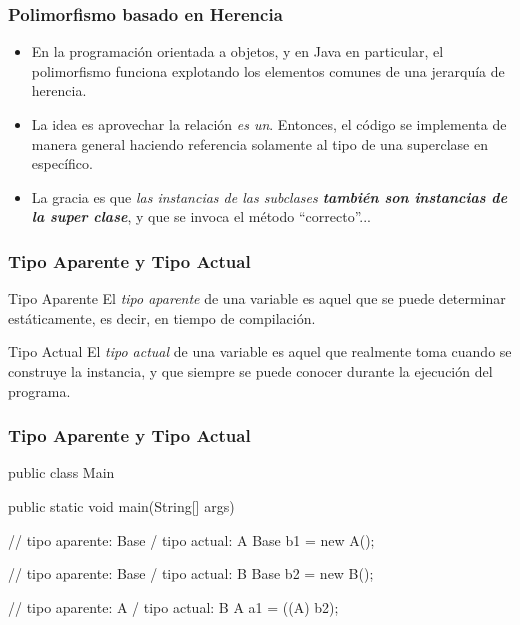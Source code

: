 \documentclass{beamer}
\begin{document}
\begin{frame}
  \frametitle{Polimorfismo basado en Herencia}

  \begin{itemize}

  \item En la programación orientada a objetos, y en Java en
    particular, el polimorfismo funciona explotando los elementos
    comunes de una jerarquía de herencia.   
    
  \item La idea es aprovechar la relación \emph{es un}. Entonces, el
    código se implementa de manera general haciendo referencia
    solamente al tipo de una superclase en específico.
    
  \item La gracia es que \emph{las instancias de las subclases \textbf{también
        son instancias de la super clase}}, y que se invoca el método
    ``correcto''...
    
  \end{itemize}
  
\end{frame}

\begin{frame}
  \frametitle{Tipo Aparente y Tipo Actual}

  \begin{alertblock}{Tipo Aparente}
    El \emph{tipo aparente} de una variable es aquel que se puede
    determinar estáticamente, es decir, en tiempo de compilación.
  \end{alertblock}

  \begin{alertblock}{Tipo Actual}
    El \emph{tipo actual} de una variable es aquel que realmente toma
    cuando se construye la instancia, y que siempre se puede conocer
    durante la ejecución del programa.
  \end{alertblock}
  
\end{frame}

\begin{frame}[fragile]
  \frametitle{Tipo Aparente y Tipo Actual}
  \begin{jsmall}
    public class Main {
      public static void main(String[] args) {
        // tipo aparente: Base / tipo actual: A
        Base b1 = new A();

        // tipo aparente: Base / tipo actual: B
        Base b2 = new B();

        // tipo aparente: A / tipo actual: B
        A a1 = ((A) b2); 
      }
    }
  \end{jsmall}  
\end{frame}
\end{document}
